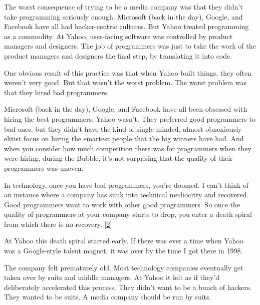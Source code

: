 The worst consequence of trying
                    to be a media company was that they didn't take programming
                    seriously enough. Microsoft (back in the day), Google, and
                    Facebook have all had hacker-centric cultures. But Yahoo
                    treated programming as a commodity. At Yahoo, user-facing
                    software was controlled by product managers and designers.
                    The job of programmers was just to take the work of the
                    product managers and designers the final step, by
                    translating it into code.

One obvious result of
                    this practice was that when Yahoo built things, they often
                    weren't very good. But that wasn't the worst problem. The
                    worst problem was that they hired bad programmers.

Microsoft
                    (back in the day), Google, and Facebook have all been
                    obsessed with hiring the best programmers. Yahoo wasn't.
                    They preferred good programmers to bad ones, but they didn't
                    have the kind of single-minded, almost obnoxiously elitist
                    focus on hiring the smartest people that the big winners
                    have had. And when you consider how much competition there
                    was for programmers when they were hiring, during the
                    Bubble, it's not surprising that the quality of their
                    programmers was uneven.

In technology, once you
                    have bad programmers, you're doomed. I can't think of an
                    instance where a company has sunk into technical mediocrity
                    and recovered. Good programmers want to work with other good
                    programmers. So once the quality of programmers at your
                    company starts to drop, you enter a death spiral from which
                    there is no recovery.
                    [\href{\#f2n}{2}]

At Yahoo this death spiral started early. If
                    there was ever a time when Yahoo was a Google-style talent
                    magnet, it was over by the time I got there in 1998.

The
                    company felt prematurely old. Most technology companies
                    eventually get taken over by suits and middle managers. At
                    Yahoo it felt as if they'd deliberately accelerated this
                    process. They didn't want to be a bunch of hackers. They
                    wanted to be suits. A media company should be run by
                    suits.


